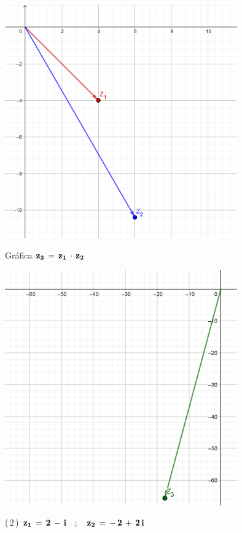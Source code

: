 \documentclass[a4paper,11pt,openany]{book}
\begin{document}
\begin{center}
    \includegraphics[width=10cm]{Gra-Ej-1-1.png}
\end{center}

\newpage

\textcolor{ao(english)}{} Gráfica $\bf{z_{3}\,=\,z_{1}\,\cdot\,z_{2}}$

\begin{center}
    \includegraphics[width=10cm]{Gra-Ej-1-2.png}
\end{center}

\textcolor{ao(english)}{(\,2\,)} $\bf{z_{1}\,=\,2\,-\,i \quad;\quad z_{2}\,=\,-\,2\,+\,2\,i}$\\
\end{document}
